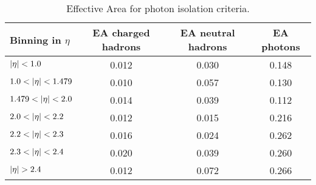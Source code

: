 \begin{table}[h!]
\begin{center}
\begin{tabular}{|l|c|c|c|}
\hline
Binning in $\eta$    & EA charged hadrons & EA neutral hadrons & EA photons \\
\hline
\hline
$\lvert \eta \rvert<1.0$ &          0.012 &	0.030 &	0.148 \\
$1.0<\lvert \eta \rvert<1.479$ & 0.010 &	0.057 &	0.130 \\
$1.479<\lvert \eta \rvert<2.0$  & 0.014 &	0.039 &	0.112 \\
$2.0<\lvert \eta \rvert<2.2$ 	&   0.012 &	0.015 &	0.216 \\
$2.2<\lvert \eta \rvert<2.3$ 	&   0.016 &	0.024 &	0.262 \\
$2.3<\lvert \eta \rvert<2.4$ 	&   0.020 &	0.039 &	0.260 \\
$\lvert \eta \rvert>2.4$ 	&   0.012 &	0.072 &	0.266  \\
\hline
\end{tabular}
\caption{Effective Area for photon isolation criteria.}
\label{Table:photonAeff}
\end{center}
\end{table}
